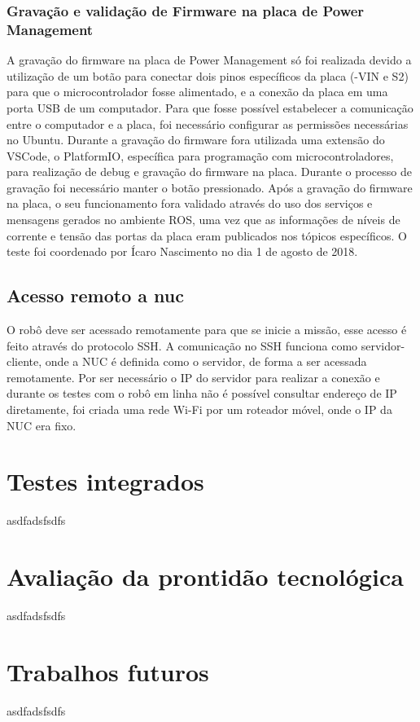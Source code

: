 \subsubsection{Gravação  e validação de Firmware na placa de Power Management}
A gravação do firmware na placa de Power Management só foi realizada devido a utilização de um botão para conectar dois pinos específicos da placa (-VIN e S2) para que o microcontrolador fosse alimentado, e a conexão da placa em uma porta USB de um computador. 
Para que fosse possível estabelecer a comunicação entre o computador e a placa, foi necessário configurar as permissões necessárias no Ubuntu. Durante a gravação do firmware fora utilizada uma extensão do VSCode, o PlatformIO, específica para programação com microcontroladores, para realização de debug e gravação do firmware na placa. 
Durante o processo de gravação foi necessário manter o botão pressionado. Após a gravação do firmware na placa, o seu funcionamento fora validado através do uso dos serviços e mensagens gerados no ambiente ROS, uma vez que as informações de níveis de corrente e tensão das portas da placa eram publicados nos tópicos específicos. O teste foi coordenado por Ícaro Nascimento no dia 1 de agosto de 2018.

\subsection{Acesso remoto a nuc}
O robô deve ser acessado remotamente para que se inicie a missão, esse acesso é feito através do protocolo SSH.
A comunicação no SSH funciona como servidor-cliente, onde a NUC é definida como o servidor, de forma a ser acessada remotamente. Por ser necessário o IP do servidor para realizar a conexão e durante os testes com o robô em linha não é possível consultar endereço de IP diretamente, foi criada uma rede Wi-Fi por um roteador móvel, onde o IP da NUC era fixo.



\section{Testes integrados}
\label{sec:testi}
asdfadsfsdfs

\section{Avaliação da prontidão tecnológica}
\label{sec:trl}
asdfadsfsdfs

\section{Trabalhos futuros}
\label{sec:trabfut}
asdfadsfsdfs





